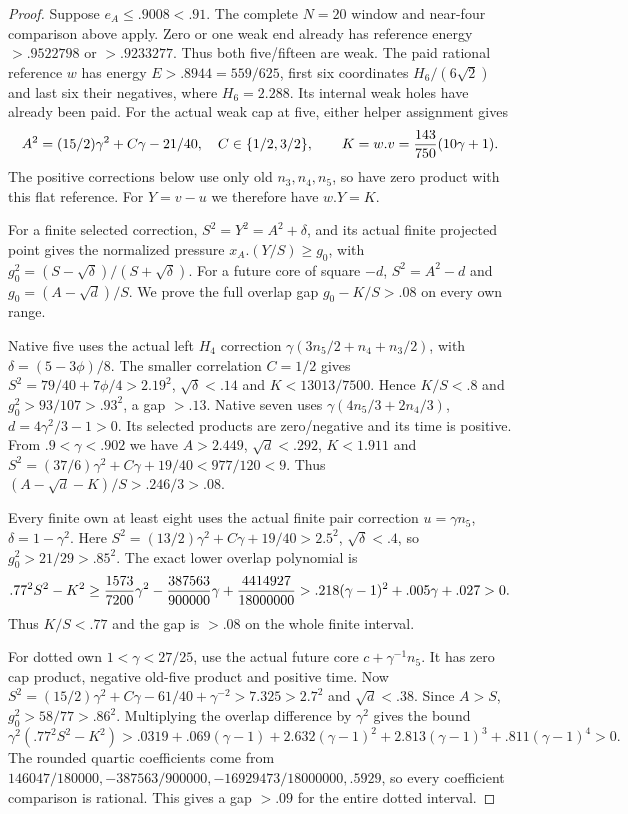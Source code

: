 \begin{proof}
Suppose $e_A\le.9008<.91$. The complete $N=20$ window and near-four
comparison above apply. Zero or one weak end already has reference
energy $>.9522798$ or $>.9233277$. Thus both five/fifteen are weak.
The paid rational reference $w$ has energy $E>.8944=559/625$,
first six coordinates $H_6/(6\sqrt2)$ and last six their negatives,
where $H_6=2.288$. Its internal weak holes have already been paid.
For the actual weak cap at five, either helper assignment gives
\[
 A^2=(15/2)\gamma^2+C\gamma-21/40,\quad C\in\{1/2,3/2\},
 \qquad K=w.v={143\over750}(10\gamma+1).
\]
The positive corrections below use only old $n_3,n_4,n_5$, so have
zero product with this flat reference. For $Y=v-u$ we therefore
have $w.Y=K$.

For a finite selected correction, $S^2=Y^2=A^2+\delta$,
and its actual finite projected point gives the normalized pressure
$x_A.(Y/S)\ge g_0$, with
$g_0^2=(S-\sqrt\delta)/(S+\sqrt\delta)$.
For a future core of square $-d$, $S^2=A^2-d$ and
$g_0=(A-\sqrt d)/S$.
We prove the full overlap gap $g_0-K/S>.08$ on every own range.

Native five uses the actual left $H_4$ correction
$\gamma(3n_5/2+n_4+n_3/2)$, with
$\delta=(5-3\phi)/8$. The smaller correlation $C=1/2$ gives
$S^2=79/40+7\phi/4>2.19^2$, $\sqrt\delta<.14$ and
$K<13013/7500$. Hence $K/S<.8$ and
$g_0^2>93/107>.93^2$, a gap $>.13$.
Native seven uses $\gamma(4n_5/3+2n_4/3)$,
$d=4\gamma^2/3-1>0$. Its selected products are zero/negative
and its time is positive. From $.9<\gamma<.902$ we have
$A>2.449$, $\sqrt d<.292$, $K<1.911$ and
$S^2=(37/6)\gamma^2+C\gamma+19/40<977/120<9$.
Thus $(A-\sqrt d-K)/S>.246/3>.08$.

Every finite own at least eight uses the actual finite pair correction
$u=\gamma n_5$, $\delta=1-\gamma^2$.
Here $S^2=(13/2)\gamma^2+C\gamma+19/40>2.5^2$,
$\sqrt\delta<.4$, so $g_0^2>21/29>.85^2$.
The exact lower overlap polynomial is
\[
 .77^2S^2-K^2\ge
 {1573\over7200}\gamma^2-{387563\over900000}\gamma
                +{4414927\over18000000}
 >.218(\gamma-1)^2+.005\gamma+.027>0.
\]
Thus $K/S<.77$ and the gap is $>.08$ on the whole finite interval.

For dotted own $1<\gamma<27/25$, use the actual future core
$c+\gamma^{-1}n_5$. It has zero cap product, negative old-five
product and positive time. Now
$S^2=(15/2)\gamma^2+C\gamma-61/40+\gamma^{-2}>7.325>2.7^2$
and $\sqrt d<.38$. Since $A>S$, $g_0^2>58/77>.86^2$.
Multiplying the overlap difference by $\gamma^2$ gives the bound
\[
 \gamma^2(.77^2S^2-K^2)>
 .0319+.069(\gamma-1)+2.632(\gamma-1)^2
       +2.813(\gamma-1)^3+.811(\gamma-1)^4>0.
\]
The rounded quartic coefficients come from
$146047/180000,-387563/900000,-16929473/18000000,.5929$,
so every coefficient comparison is rational. This gives a gap
$>.09$ for the entire dotted interval.


\end{proof}
